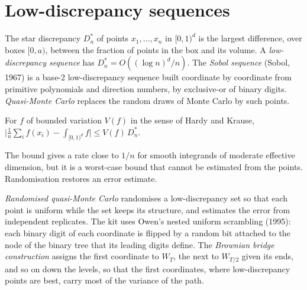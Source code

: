 \section{Low-discrepancy sequences}

\begin{definition}\label{def:qm:monte-carlo:qmc}
The star discrepancy $D_n^*$ of points $x_1, \dots, x_n$ in $[0, 1)^d$ is the largest difference, over boxes $[0, a)$, between the fraction of points in the box and its volume. A \emph{low-discrepancy
sequence} has $D_n^* = O((\log n)^d/n)$. The \emph{Sobol sequence} (Sobol, 1967) is a base-2 low-discrepancy sequence built coordinate by
coordinate from primitive polynomials and direction numbers, by exclusive-or of binary digits. \emph{Quasi-Monte Carlo} replaces the random draws of Monte Carlo by such
points.
\end{definition}

\begin{proposition}\label{prop:qm:monte-carlo:kh}
For $f$ of bounded variation $V(f)$ in the sense of Hardy and Krause, $\bigl|\frac1n\sum_if(x_i) - \int_{[0,1)^d}f\bigr| \le V(f)\,D_n^*$.
\end{proposition}

The bound gives  a rate close to $1/n$ for smooth integrands of moderate effective dimension, but it is a worst-case bound that cannot be estimated from the points. Randomisation
restores an error estimate.

\begin{definition}\label{def:qm:monte-carlo:rqmc}
\emph{Randomised quasi-Monte Carlo} randomises a low-discrepancy set so that each point is uniform while the set keeps its structure, and estimates the error
from independent replicates. The kit uses Owen's nested uniform scrambling (1995): each binary digit of each coordinate is flipped by a random bit attached to the node of the binary tree that its
leading digits define. The \emph{Brownian bridge construction} assigns the first coordinate to $W_T$, the next to $W_{T/2}$ given its ends, and so on
down the levels, so that the first coordinates, where low-discrepancy points are best, carry most of the variance of the path.
\end{definition}


